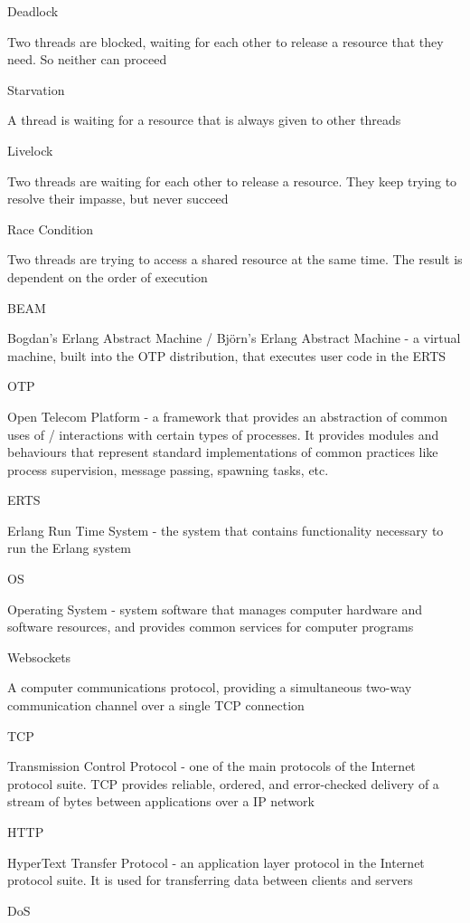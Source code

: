 \documentclass[]{final}
\begin{document}
Deadlock

Two threads are blocked, waiting for each other to release a resource that they need. So neither can proceed

Starvation

A thread is waiting for a resource that is always given to other threads

Livelock

Two threads are waiting for each other to release a resource. They keep trying to resolve their impasse, but never succeed

Race Condition

Two threads are trying to access a shared resource at the same time. The result is dependent on the order of execution

BEAM

Bogdan's Erlang Abstract Machine / Björn's Erlang Abstract Machine - a virtual machine, built into the OTP
distribution, that executes user code in the ERTS

OTP

Open Telecom Platform - a framework that provides an abstraction of common uses of / interactions with
certain types of processes. It provides modules and behaviours that represent standard implementations of
common practices like process supervision, message passing, spawning tasks, etc.

ERTS

Erlang Run Time System - the system that contains functionality necessary to run the Erlang system

OS

Operating System - system software that manages computer hardware and software resources, and
provides common services for computer programs

Websockets

A computer communications protocol, providing a simultaneous two-way communication channel
over a single TCP connection

TCP

Transmission Control Protocol - one of the main protocols of the Internet protocol suite. TCP provides
reliable, ordered, and error-checked delivery of a stream of bytes between applications over a IP network

HTTP

HyperText Transfer Protocol - an application layer protocol in the Internet protocol suite.
It is used for transferring data between clients and servers

DoS
\end{document}
